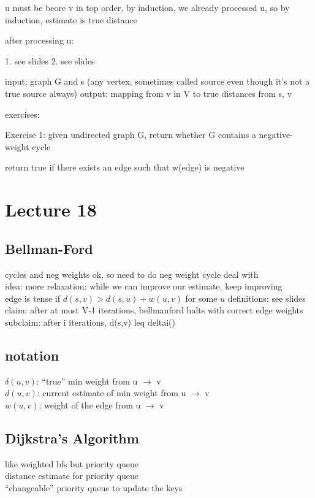 \documentclass{article}
\begin{document}
u must be beore v in top order, by induction, we already processed u, so by induction, 
estimate is true distance

after processing u:

1. see slides
2. see slides






input: graph G and s (any vertex, sometimes called source even though it's not a true source always)
output: mapping from v in V to true distances from s, v




exercises:

Exercise 1: given undirected graph G, return whether G contains a negative-weight cycle


return true if there exists an edge such that w(edge) is negative


\section{Lecture 18}
\subsection{Bellman-Ford}
cycles and neg weights ok, so need to do neg weight cycle deal with\\
idea: more relaxation: while we can improve our estimate, keep improving\\
edge is tense if $d(s,v) > d(s,u) + w(u,v)$ for some $u$
definitions: see slides\\
claim: after at most V-1 iterations, bellmanford halts with correct edge weights\\
subclaim: after i iterations, d(s,v) leq deltai()
\subsection{notation}
$\delta (u,v)$: ``true'' min weight from u $\rightarrow$ v\\
$d(u,v)$: current estimate of min weight from u $\rightarrow$ v\\
$w(u,v)$: weight of the edge from u $\rightarrow$ v\\

\subsection{Dijkstra's Algorithm}
like weighted bfs but priority queue\\
distance estimate for priority queue\\
``changeable'' priority queue to update the keys
\end{document}
